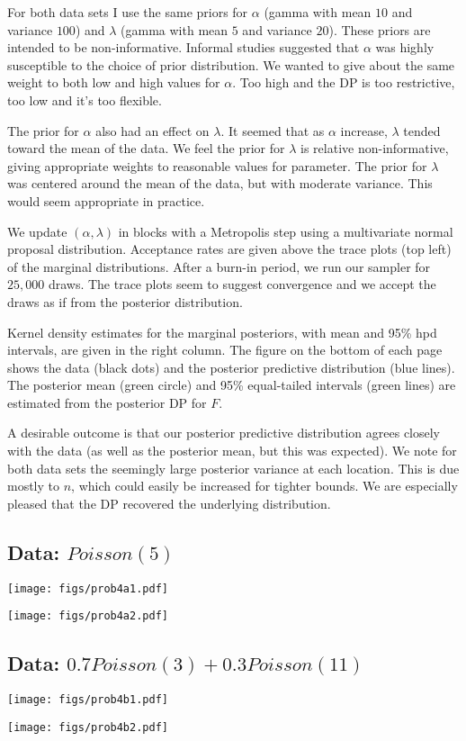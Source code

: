 \documentclass[12pt]{article}
\begin{document}
\noindent For both data sets I use the same priors for $\alpha$ (gamma with mean $10$ and variance $100$) and $\lambda$ (gamma with mean $5$ and variance $20$). These priors are intended to be non-informative. Informal studies suggested that $\alpha$ was highly susceptible to the choice of prior distribution. We wanted to give about the same weight to both low and high values for $\alpha$. Too high and the DP is too restrictive, too low and it's too flexible.
\bigskip

\noindent The prior for $\alpha$ also had an effect on $\lambda$. It seemed that as $\alpha$ increase, $\lambda$ tended toward the mean of the data. We feel the prior for $\lambda$ is relative non-informative, giving appropriate weights to reasonable values for parameter. The prior for $\lambda$ was centered around the mean of the data, but with moderate variance. This would seem appropriate in practice.
\bigskip

\noindent We update $(\alpha, \lambda)$ in blocks with a Metropolis step using a multivariate normal proposal distribution. Acceptance rates are given above the trace plots (top left) of the marginal distributions. After a burn-in period, we run our sampler for $25,000$ draws. The trace plots seem to suggest convergence and we accept the draws as if from the posterior distribution.
\bigskip

\noindent Kernel density estimates for the marginal posteriors, with mean and 95\% hpd intervals, are given in the right column. The figure on the bottom of each page shows the data (black dots) and the posterior predictive distribution (blue lines). The posterior mean (green circle) and 95\% equal-tailed intervals (green lines) are estimated from the posterior DP for $F$.
\bigskip

\noindent A desirable outcome is that our posterior predictive distribution agrees closely with the data (as well as the posterior mean, but this was expected). We note for both data sets the seemingly large posterior variance at each location. This is due mostly to $n$, which could easily be increased for tighter bounds. We are especially pleased that the DP recovered the underlying distribution.

\newpage

\subsection*{Data: $Poisson(5)$}

\begin{center}
\texttt{[image: figs/prob4a1.pdf]}
\end{center}

\begin{center}
\texttt{[image: figs/prob4a2.pdf]}
\end{center}

\newpage

\subsection*{Data: $0.7Poisson(3)+0.3Poisson(11)$}

\begin{center}
\texttt{[image: figs/prob4b1.pdf]}
\end{center}

\begin{center}
\texttt{[image: figs/prob4b2.pdf]}
\end{center}
\end{document}
